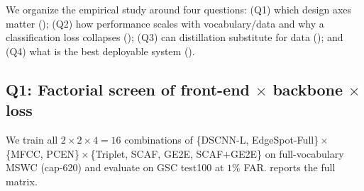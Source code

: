 \documentclass[10pt,twocolumn]{article}
\begin{document}
We organize the empirical study around four questions: (Q1) which design axes
matter (); (Q2) how performance scales with vocabulary/data and
why a classification loss collapses (); (Q3) can distillation
substitute for data (); and (Q4) what is the best deployable system
().

\subsection{Q1: Factorial screen of front-end $\times$ backbone $\times$ loss}
\label{sec:matrix}

We train all $2\times2\times4=16$ combinations of
\{DSCNN-L, EdgeSpot-Full\}\,$\times$\,\{MFCC, PCEN\}\,$\times$\,\{Triplet, SCAF,
GE2E, SCAF$+$GE2E\} on full-vocabulary MSWC (cap-620) and evaluate on GSC
test100 at $1\%$ FAR.  reports the full matrix.
\end{document}
